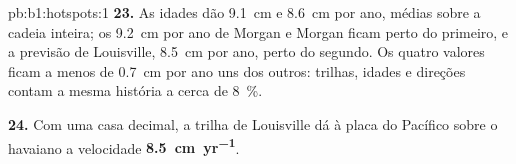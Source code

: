\begin{solution}{pb:b1:hotspots:1}
\textbf{23.} As idades dão \qty{9.1}{cm} e \qty{8.6}{cm} por ano, médias sobre a cadeia inteira; os \qty{9.2}{cm} por ano de Morgan e Morgan ficam perto do primeiro, e a previsão de Louisville, \qty{8.5}{cm} por ano, perto do segundo. Os quatro valores ficam a menos de \qty{0.7}{cm} por ano uns dos outros: trilhas, idades e direções contam a mesma história a cerca de \qty{8}{\percent}.

\textbf{24.} Com uma casa decimal, a trilha de Louisville dá à placa do Pacífico sobre o  havaiano a velocidade
\textbf{\qty[text-series-to-math=true]{8.5}{cm.yr^{-1}}}.
\end{solution}

